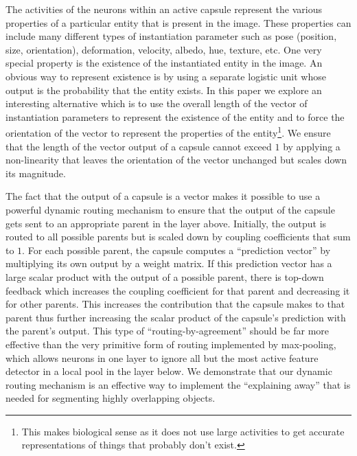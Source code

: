 \documentclass{article}
\begin{document}
The activities of the neurons within an active capsule represent the various properties of a particular entity that is present in the image.   These properties can include many different types of instantiation parameter such as pose (position, size, orientation), deformation, velocity, albedo, hue, texture, etc. One very special property is the existence of the instantiated entity in the image. An obvious way to represent existence is by using a separate logistic unit whose output is the probability that the entity exists.  In this paper we explore an interesting alternative which is to use the overall length of the vector of instantiation parameters to represent the existence of the entity and to force the orientation of the vector to represent the properties of the entity\footnote{This makes biological sense as it does not use large activities to get accurate representations of things that probably don't exist.}.  We ensure that the length of the vector output of a capsule cannot exceed $1$ by applying a non-linearity that leaves the orientation of the vector unchanged but scales down its magnitude. 

The fact that the output of a capsule is a vector makes it possible to use a powerful dynamic routing mechanism to ensure that the output of the capsule gets sent to an appropriate parent in the layer above. Initially, the output is routed to all possible parents but is scaled down by coupling coefficients that sum to $1$. For each possible parent, the capsule computes a ``prediction vector'' by multiplying its own output by a weight matrix. If this prediction vector has a large scalar product with the output of a possible parent, there is top-down feedback which increases the coupling coefficient for that parent and decreasing it for other parents.  This increases the contribution that the capsule makes to that parent thus further increasing the scalar product of the capsule's prediction with the parent's output. This type of ``routing-by-agreement'' should be far more effective than the very primitive form of routing implemented by max-pooling, which allows neurons in one layer to ignore all but the most active feature detector in a local pool in the layer below. We demonstrate that our dynamic routing mechanism is an effective way to implement the ``explaining away'' that is needed for segmenting highly overlapping objects.
\end{document}
